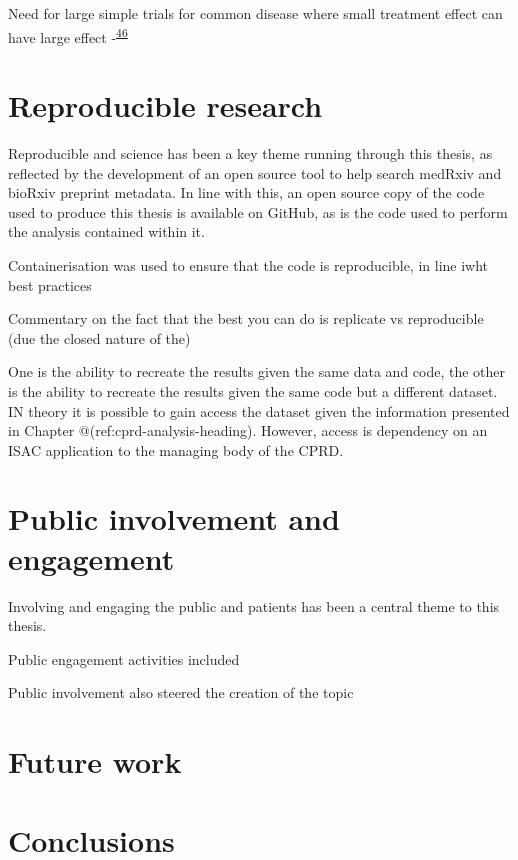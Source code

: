 \documentclass[a4paper, twoside]{templates/ociamthesis}
\begin{document}
Need for large simple trials for common disease where small treatment effect can have large effect -\textsuperscript{\protect\hyperlink{ref-yusuf1984}{46}}

\hypertarget{reproducible-research}{%
\section{Reproducible research}\label{reproducible-research}}

Reproducible and science has been a key theme running through this thesis, as reflected by the development of an open source tool to help search medRxiv and bioRxiv preprint metadata. In line with this, an open source copy of the code used to produce this thesis is available on GitHub, as is the code used to perform the analysis contained within it.

Containerisation was used to ensure that the code is reproducible, in line iwht best practices

Commentary on the fact that the best you can do is replicate vs reproducible (due the closed nature of the)

One is the ability to recreate the results given the same data and code, the other is the ability to recreate the results given the same code but a different dataset. IN theory it is possible to gain access the dataset given the information presented in Chapter @(ref:cprd-analysis-heading). However, access is dependency on an ISAC application to the managing body of the CPRD.

\hypertarget{public-involvement-and-engagement}{%
\section{Public involvement and engagement}\label{public-involvement-and-engagement}}

Involving and engaging the public and patients has been a central theme to this thesis.

Public engagement activities included

Public involvement also steered the creation of the topic

\hypertarget{future-work}{%
\section{Future work}\label{future-work}}

\hypertarget{conclusions-1}{%
\section{Conclusions}\label{conclusions-1}}
\end{document}
